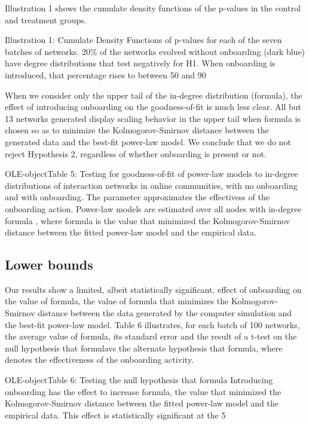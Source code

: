 Illustration 1 shows the cumulate density functions of the p-values in the control and treatment groups. 

Illustration 1: Cumulate Density Functions of p-values for each of the seven batches of networks. 20\% of the networks evolved without onboarding (dark blue) have degree distributions that test negatively for H1. When onboarding is introduced, that percentage rises to between 50 and 90%

When we consider only the upper tail of the in-degree distribution (formula), the effect of introducing onboarding on the goodness-of-fit is much less clear. All but 13 networks generated display scaling behavior in the upper tail when formula is chosen so as to minimize the Kolmogorov-Smirnov distance between the generated data and the best-fit power-law model. We conclude that we do not reject Hypothesis 2, regardless of whether onboarding is present or not. 

OLE-objectTable 5: Testing for goodness-of-fit of power-law models to in-degree distributions of interaction networks in online communities, with no onboarding and with onboarding. The  parameter approximates the effectivess of the onboarding action. Power-law models are estimated over all nodes with in-degree formula , where formula is the value that minimized the Kolmogorov-Smirnov distance between the fitted power-law model and the empirical data.

\subsection{Lower bounds}
Our results show a limited, albeit statistically significant, effect of onboarding on the value of formula, the value of formula that minimizes the Kolmogorov-Smirnov distance between the data generated by the computer simulation and the best-fit power-law model. Table 6 illustrates, for each batch of 100 networks, the average value of formula, its standard error and the  result of a t-test on the null hypothesis that formulavs the alternate hypothesis that formula, where denotes the effectiveness of the onboarding activity. 

OLE-objectTable 6: Testing the null hypothesis that formula Introducing onboarding has the effect to increase formula, the value that minimized the Kolmogorov-Smirnov distance between the fitted power-law model and the empirical data. This effect is statistically significant at the 5%

